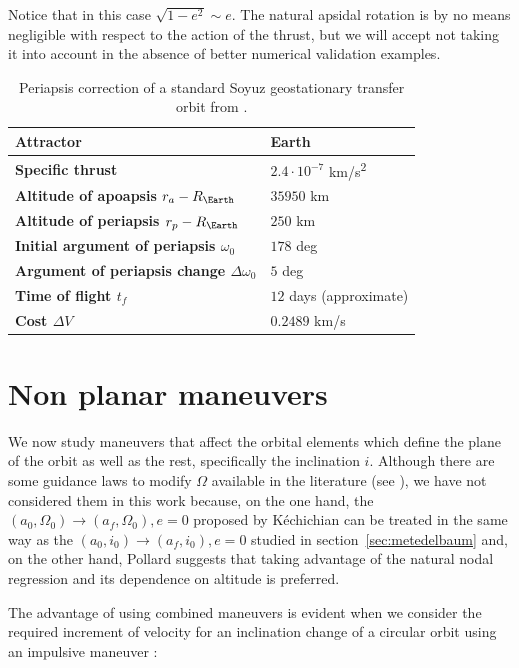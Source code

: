 Notice that in this case $\sqrt{1 - e^2} \sim e$. The natural apsidal rotation is by no means negligible with respect to the action of the thrust, but we will accept not taking it into account in the absence of better numerical validation examples.

\begin{table}
\centering
\begin{tabular}{|l|l|}
\hline
\textbf{Attractor}            & Earth \\ \hline
\textbf{Specific thrust}            & $2.4 \cdot 10^{-7}$ km/s\textsuperscript{2}      \\ \hline
\textbf{Altitude of apoapsis $r_a - R_{\Earth}$} & $35950$ km \\ \hline
\textbf{Altitude of periapsis $r_p - R_{\Earth}$} & $250$ km \\ \hline
\textbf{Initial argument of periapsis $\omega_0$} & $178$ deg \\ \hline
\textbf{Argument of periapsis change $\Delta \omega_0$} & $5$ deg \\ \hline
\textbf{Time of flight $t_f$} & $12$ days (approximate) \\ \hline
\textbf{Cost $\Delta V$} & $0.2489$ km/s \\ \hline
\end{tabular}
\caption{Periapsis correction of a standard Soyuz geostationary transfer orbit from \cite{ruggiero2011low}.}
\label{tab:gto}
\end{table}

\section{Non planar maneuvers} \label{sec:metnonplanar}

We now study maneuvers that affect the orbital elements which define the plane of the orbit as well as the rest, specifically the inclination $i$. Although there are some guidance laws to modify $\Omega$ available in the literature (see \cite{kechichian2010analytic,pollard1997simplified}), we have not considered them in this work because, on the one hand, the $(a_0, \Omega_0) \rightarrow (a_f, \Omega_0), e = 0$ proposed by Kéchichian can be treated in the same way as the $(a_0, i_0) \rightarrow (a_f, i_0), e = 0$ studied in section~\ref{sec:metedelbaum} and, on the other hand, Pollard suggests that taking advantage of the natural nodal regression and its dependence on altitude is preferred.

The advantage of using combined maneuvers is evident when we consider the required increment of velocity for an inclination change of a circular orbit using an impulsive maneuver \cite{vallado2001fundamentals}:


